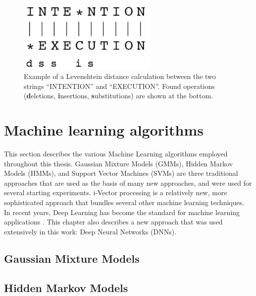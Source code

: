 \begin{figure}
	\begin{center}
		\includegraphics[width=0.6\textwidth]{images/levenshtein_example.png}
		\caption{Example of a Levenshtein distance calculation between the two strings ``INTENTION'' and ``EXECUTION''. Found operations (\textbf{d}eletions, \textbf{i}nsertions, \textbf{s}ubstitutions) are shown at the bottom. \cite{levenshtein_lecture}}
		\label{fig:levenshtein_example}
	\end{center}
\end{figure}




\section{Machine learning algorithms}
This section describes the various Machine Learning algorithms employed throughout this thesis. Gaussian Mixture Models (GMMs), Hidden Markov Models (HMMs), and Support Vector Machines (SVMs) are three traditional approaches that are used as the basis of many new approaches, and were used for several starting experiments. i-Vector processing is a relatively new, more sophisticated approach that bundles several other machine learning techniques.\\
In recent years, Deep Learning has become the standard for machine learning applications \cite{}. This chapter also describes a new approach that was used extensively in this work: Deep Neural Networks (DNNs).



\subsection{Gaussian Mixture Models}
\subsection{Hidden Markov Models}

